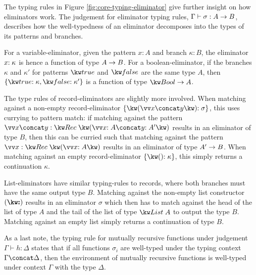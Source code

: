 

\noindent
The typing rules in Figure \ref{fig:core-typing-eliminator} give further insight on how eliminators work. The judgement for eliminator typing rules, $\Gamma \vdash \sigma: {A}\rightarrow{B}$, describes how the well-typedness of an eliminator decomposes into the types of its patterns and branches. 

For a variable-eliminator, given the pattern $x : A$ and branch $\kappa : B$, the eliminator ${x}{:}\;{\kappa}$ is hence a function of type ${A}\rightarrow{B}$. For a boolean-eliminator, if the branches $\kappa$ and $\kappa'$ for patterns $\exTrue$ and $\exFalse$ are the same type $A$, then $\elimBool{\kappa}{\kappa'}$ is a function of type $\tyFun{\tyBool}{A}$. 

The type rules of record-eliminators are slightly more involved. When matching against a non-empty record-eliminator $\elimRec{\vec{x} \concat y}{\sigma}$, this uses currying to pattern match: if matching against the pattern $\vec{x} \concat y : \tyRec{\vec{\bind{x}{A}} \concat \bind{y}{A'}}$ results in an eliminator of type $B$, then this can be curried such that matching against the pattern $\vec{x} : \tyRec{\vec{\bind{x}{A}}}$ results in an eliminator of type ${A'}\rightarrow{B}$. When matching against an empty record-eliminator $\elimRecEmpty{\kappa}$, this simply returns a continuation $\kappa$. 

List-eliminators have similar typing-rules to records, where both branches must have the same output type $B$. Matching against the non-empty list constructor $(\symCons)$ results in an eliminator $\sigma$ which then has to match against the head of the list of type $A$ and the tail of the list of type $\tyList{A}$ to output the type $B$. Matching against an empty list simply returns a continuation of type $B$.

As a last note, the typing rule for mutually recursive functions under judgement $\Gamma \vdash h: \Delta$ states that if all functions $\sigma_i$ are well-typed under the typing context $\Gamma \concat \Delta$, then the environment of mutually recursive functions is well-typed under context $\Gamma$ with the type $\Delta$.




